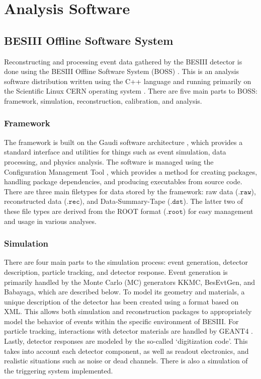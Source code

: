 \chapter{Analysis Software}
\label{ch:software}

\section{BESIII Offline Software System}

Reconstructing and processing event data gathered by the BESIII detector is done using the BESIII Offline Software System (BOSS) \cite{ref:Li:2006}.
This is an analysis software distribution written using the C++ language and running primarily on the Scientific Linux CERN operating system \cite{ref:SLC5}.
There are five main parts to BOSS: framework, simulation, reconstruction, calibration, and analysis.


\subsection{Framework}

The framework is built on the Gaudi software architecture \cite{ref:Barrand:2001}, which provides a standard interface and utilities for things such as event simulation, data processing, and physics analysis.
The software is managed using the Configuration Management Tool \cite{ref:Arnault:2000}, which provides a method for creating packages, handling package dependencies, and producing executables from source code.
There are three main filetypes for data stored by the framework: raw data ($\texttt{.raw}$), reconstructed data ($\texttt{.rec}$), and Data-Summary-Tape ($\texttt{.dst}$).
The latter two of these file types are derived from the ROOT \cite{ref:ROOT} format ($\texttt{.root}$) for easy management and usage in various analyses.


\subsection{Simulation}

There are four main parts to the simulation process: event generation, detector description, particle tracking, and detector response.
Event generation is primarily handled by the Monte Carlo (MC) generators KKMC, BesEvtGen, and Babayaga, which are described below.
To model its geometry and materials, a unique description of the detector has been created using a format based on XML.
This allows both simulation and reconstruction packages to appropriately model the behavior of events within the specific environment of BESIII.
For particle tracking, interactions with detector materials are handled by GEANT4 \cite{ref:Agostinelli:2003}.
Lastly, detector responses are modeled by the so-called `digitization code'.
This takes into account each detector component, as well as readout electronics, and realistic situations such as noise or dead channels.
There is also a simulation of the triggering system implemented.


